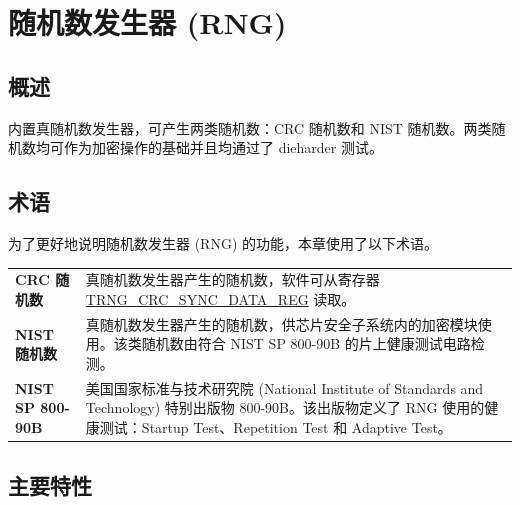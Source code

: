 \documentclass[main\_\_CN.tex]{subfiles}
\begin{document}

\ifglobal
\else
    {\let\clearpage\relax \listoftodos}
    {\let\clearpage\relax \listofdonetodos}
    \tableofcontents
\fi



\hypertarget{rng}{}
\chapter{随机数发生器 (RNG)}\label{mod:rng}

\section{概述}\label{sec:rng-overview}

\chipname{} 内置真随机数发生器，可产生两类随机数：CRC 随机数和 NIST 随机数。两类随机数均可作为加密操作的基础并且均通过了 dieharder 测试。


\section{术语}
\label{sec:rng-term}

为了更好地说明随机数发生器 (RNG) 的功能，本章使用了以下术语。

\begin{longtable}[c]{ R{4cm} p{12cm} }
    \textbf{CRC 随机数} & 真随机数发生器产生的随机数，软件可从寄存器 \hyperref[regdesc:TRNGCRCSYNCDATAREG]{TRNG\_CRC\_SYNC\_DATA\_REG} 读取。\\
    \textbf{NIST 随机数} & 真随机数发生器产生的随机数，供芯片安全子系统内的加密模块使用。该类随机数由符合 NIST SP 800-90B 的片上健康测试电路检测。\\
    \textbf{NIST SP 800-90B} & 美国国家标准与技术研究院 (National Institute of Standards and Technology) 特别出版物 800-90B。该出版物定义了 RNG 使用的健康测试：Startup Test、Repetition Test 和 Adaptive Test。\\
\end{longtable}

\section{主要特性}
\label{sec:rng-features}
\end{document}
